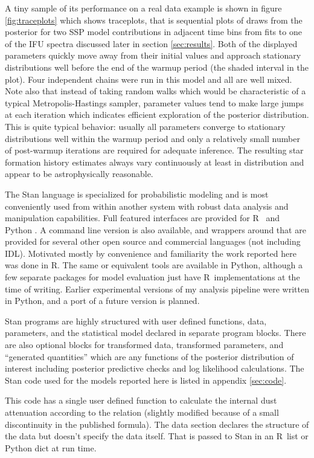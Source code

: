 \documentclass[modern]{aastex62}
\newcommand{\R}{{\normalfont\textsf{R}}{}}
\begin{document}
A tiny sample of its performance on a real data example is shown in figure \ref{fig:traceplots} which shows traceplots, that is sequential plots of draws from the posterior for two SSP model contributions in adjacent time bins from fits to one of the IFU spectra discussed later in section \ref{sec:results}. Both of the displayed parameters quickly move away from their initial values and approach stationary distributions well before the end of the warmup period (the shaded interval in the plot). Four independent chains were run in this model and all are well mixed. Note also that instead of taking random walks which would be characteristic of a typical Metropolis-Hastings sampler, parameter values tend to make large jumps at each iteration which indicates efficient exploration of the posterior distribution. This is quite typical behavior: usually all parameters converge to stationary distributions well within the warmup period and only a relatively small number of post-warmup iterations are required for adequate inference. The resulting star formation history estimates always vary continuously at least in distribution and appear to be astrophysically reasonable.

The Stan language is specialized for probabilistic modeling and is most conveniently used from within another system with robust data analysis and manipulation capabilities. Full featured interfaces are provided for \R~ \citep{rstan, rsystem} and Python \citep{pystan}. A command line version is also available, and wrappers around that are provided for several other open source and commercial languages (not including IDL). Motivated mostly by convenience and familiarity the work reported here was done in \R. The same or equivalent tools are available in Python, although a few separate packages for model evaluation just have \R~implementations at the time of writing. Earlier experimental versions of my analysis pipeline were written in Python, and a port of a future version is planned.

Stan programs are highly structured with user defined functions, data, parameters, and the statistical model declared in separate program blocks. There are also optional blocks for transformed data, transformed parameters, and ``generated quantities'' which are any functions of the posterior distribution of interest including posterior predictive checks and log likelihood calculations. The Stan code used for the models reported here is listed in appendix \ref{sec:code}.

This code has a single user defined function to calculate the internal dust attenuation according to the \citet{2001PASP..113.1449C} relation (slightly modified because of a small discontinuity in the published formula). The data section declares the structure of the data but doesn't specify the data itself. That is passed to Stan in an \R~list or Python dict at run time.
\end{document}
